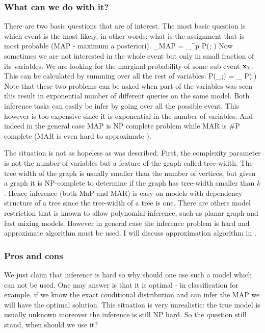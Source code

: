 \subsubsection{What can we do with it?}
There are two basic questions that are of interest.
The most basic question is which event is the most likely, in other words: what is the assignment that is most probable (MAP - maximum a posteriori).
\be
\label{eq:MAP}
\xx_{MAP} = \arg \max_{\xx \in \cX^p} P(\xx; \thetav) 
\ee
Now sometimes we are not interested in the whole event but only in small fraction of its variables.
We are looking for the marginal probability of some sub-event ${\bf x}_{{\cal I}}$.
This can be calculated by summing over all the rest of variables:
\be
\label{eq:MAR}
P(\xx_{\cI};\thetav) = \sum_{} P(\zz;\thetav)
\ee
Note that these two problems can be asked when part of the variables was seen this result in exponential number of different queries on the same model. 
Both inference tasks can easily be infer by going over all the possible event.
This however is too expensive since it is exponential in the number of variables.
And indeed in the general case MAP\cite{shimony1994finding} is NP complete problem while MAR\cite{cooper1990computational} is \#P complete (MAR is even hard to approximate \cite{roth1996hardness}).

The situation is not as hopeless as was described.
First, the complexity parameter is not the number of variables but a feature of the graph called tree-width\cite{robertson1983graph,robertson1994quickly}.
The tree width of the graph is usually smaller than the number of vertices, but given a graph it is NP-complete to determine if the graph has tree-width smaller than $k$\cite{Arnborg:1987}.
Hence inference (both MaP and MAR) is easy on models with dependency structure of a tree since the tree-width of a tree is one.
There are others model restriction that is known to allow polynomial inference, such as planar graph \cite{jaakkola2007approximate} and fast mixing models\cite{jerrum1993polynomial}.
However in general case the inference problem is hard and approximate algorithm must be used.
I will discuss approximation algorithm in  . 
\subsubsection{Pros and cons}
We just claim that inference is hard so why should one use such a model which can not be used.
One may answer is that it is optimal - in classification for example, if we know the exact conditional distribution and can infer the MAP we will have the optimal solution. 
This situation is very unrealistic: the true model is usually unknown moreover the inference is still NP hard.
So the question still stand, when should we use it?

